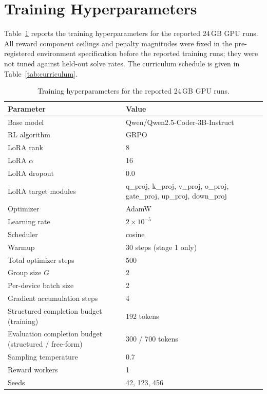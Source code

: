 \documentclass{article}
\begin{document}
\clearpage
\appendix

\section{Training Hyperparameters}
\label{app:hyperparams}

Table~\ref{tab:hyperparams} reports the training hyperparameters for the reported 24\,GB GPU runs. All reward component ceilings and penalty magnitudes were fixed in the pre-registered environment specification before the reported training runs; they were not tuned against held-out solve rates. The curriculum schedule is given in Table~\ref{tab:curriculum}.

\begin{table}[h]
\centering
\small
\begin{tabular}{ll}
\toprule
\textbf{Parameter} & \textbf{Value} \\
\midrule
Base model & Qwen/Qwen2.5-Coder-3B-Instruct \\
RL algorithm & GRPO \\
LoRA rank & 8 \\
LoRA $\alpha$ & 16 \\
LoRA dropout & 0.0 \\
LoRA target modules & q\_proj, k\_proj, v\_proj, o\_proj, gate\_proj, up\_proj, down\_proj \\
Optimizer & AdamW \\
Learning rate & $2\times10^{-5}$ \\
Scheduler & cosine \\
Warmup & 30 steps (stage 1 only) \\
Total optimizer steps & 500 \\
Group size $G$ & 2 \\
Per-device batch size & 2 \\
Gradient accumulation steps & 4 \\
Structured completion budget (training) & 192 tokens \\
Evaluation completion budget (structured / free-form) & 300 / 700 tokens \\
Sampling temperature & 0.7 \\
Reward workers & 1 \\
Seeds & 42, 123, 456 \\
\bottomrule
\end{tabular}
\caption{Training hyperparameters for the reported 24\,GB GPU runs.}
\label{tab:hyperparams}
\end{table}
\end{document}
